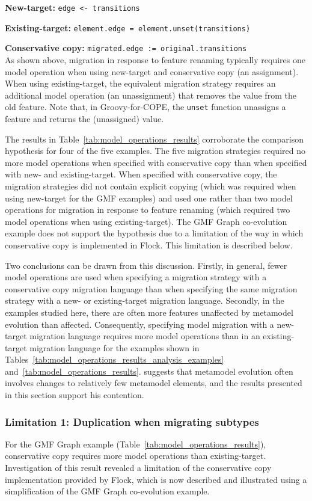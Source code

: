 \textbf{New-target:} \texttt{edge <- transitions}

\textbf{Existing-target:} \texttt{element.edge = element.unset(transitions)}

\textbf{Conservative copy:} \texttt{migrated.edge := original.transitions}
\\

As shown above, migration in response to feature renaming typically requires one model operation when using new-target and conservative copy (an assignment). When using existing-target, the equivalent migration strategy requires an additional model operation (an unassignment) that removes the value from the old feature. Note that, in Groovy-for-COPE, the \texttt{unset} function unassigns a feature and returns the (unassigned) value.


The results in Table~\ref{tab:model_operations_results} corroborate the comparison hypothesis for four of the five examples. The five migration strategies required no more model operations when specified with conservative copy than when specified with new- and existing-target. When specified with conservative copy, the migration strategies did not contain explicit copying (which was required when using new-target for the GMF examples) and used one rather than two model operations for migration in response to feature renaming (which required two model operations when using existing-target). The GMF Graph co-evolution example does not support the hypothesis due to a limitation of the way in which conservative copy is implemented in Flock. This limitation is described below. 

Two conclusions can be drawn from this discussion. Firstly, in general, fewer model operations are used when specifying a migration strategy with a conservative copy migration language than when specifying the same migration strategy with a new- or existing-target migration language. Secondly, in the examples studied here, there are often more features unaffected by metamodel evolution than affected. Consequently, specifying model migration with a new-target migration language requires more model operations than in an existing-target migration language for the examples shown in Tables~\ref{tab:model_operations_results_analysis_examples} and~\ref{tab:model_operations_results}. \cite{sprinkle03thesis} suggests that metamodel evolution often involves changes to relatively few metamodel elements, and the results presented in this section support his contention.  


\subsubsection{Limitation 1: Duplication when migrating subtypes}
For the GMF Graph example (Table~\ref{tab:model_operations_results}), conservative copy requires more model operations than existing-target. Investigation of this result revealed a limitation of the conservative copy implementation provided by Flock, which is now described and illustrated using a simplification of the GMF Graph co-evolution example.

